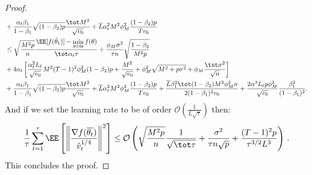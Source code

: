 \documentclass[manuscript,screen,review]{acmart}
\begin{document}
\begin{proof}
\begin{align*}
   &  +\frac{\alpha_t \beta_1}{1-\beta_1}  \sqrt{(1-\beta_2)p} \frac{\tot M^2}{\sqrt{v_0}} +\overline{L} \alpha_t^2 M^2 \phi_M^2 \frac{(1-\beta_2)p}{Tv_0} \nonumber\\
   & \leq   \sqrt{\frac{M^2 p}{n}}  \frac{ \EE[f(\bar{\theta}_1)]  - \min \limits_{\theta \in \Theta} f(\theta)}{\tot \alpha_t \tau} +      \frac{\phi_M   \sigma^2}{\tau n} \sqrt{\frac{1 - \beta_2}{M^2 p}  } \nonumber\\
    &   +4\alpha_t \left[ \frac{\alpha_t^2 L_\ell}{\sqrt{v_0}}  M^2 (T-1)^2 \phi_M^2 (1-\beta_2)p + \frac{M^2}{\sqrt{v_0}}+\phi_M^2\sqrt{M^2+p\sigma^2} + \phi_M \frac{\tot \sigma^2}{\sqrt{n}}\right]   \nonumber\\
   &  +\frac{\alpha_t \beta_1}{1-\beta_1}  \sqrt{(1-\beta_2)p} \frac{\tot M^2}{\sqrt{v_0}} +\overline{L} \alpha_t^2 M^2 \phi_M^2 \frac{(1-\beta_2)p}{Tv_0}  + \frac{ \overline{L}\beta_1^2\tot(1-\beta_2)M^2 \phi^2_M n}{2(1-\beta_1)^2 v_0}  +\frac{2\alpha^3 L_\ell p\phi_M^2}{ \sqrt{v_0}}\frac{\beta_1^2}{(1-\beta_1)^2}.
\end{align*}
 And if we set the learning rate to be of order $\mathcal{O}(\frac{1}{L \sqrt{\tau}})$ then:
 \begin{align*}
     \frac{1}{\tau}\sum_{t=1}^\tau  \EE\left[ \left\| \frac{\nabla f(\overline{\theta_t})}{\hat v_t^{1/4}}   \right \|^2 \right] \leq \mathcal{O}\left( \sqrt{\frac{M^2 p}{n}} \frac{1}{\sqrt{\tot \tau}} + \frac{\sigma^2 }{\tau n\sqrt{p}}+\frac{(T-1)^2p}{\tau^{3/2}L^3}\right) \, .
\end{align*}
This concludes the proof.

\end{proof}
\end{document}
